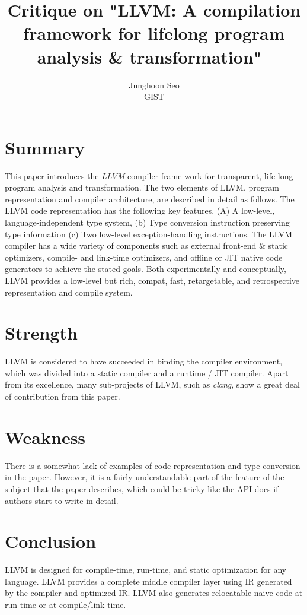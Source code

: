 \documentclass[11pt,a4paper]{article}
\begin{document}
\title{Critique on "LLVM: A compilation framework for lifelong program analysis \& transformation"~\cite{lattner2004llvm}}
\author{Junghoon Seo\\GIST}

\maketitle

\section{Summary}

This paper introduces the \textit{LLVM} compiler frame work for transparent, life-long program analysis and transformation. The two elements of LLVM, program representation and compiler architecture, are described in detail as follows. The LLVM code representation has the following key features. (A) A low-level, language-independent type system, (b) Type conversion instruction preserving type information (c) Two low-level exception-handling instructions. The LLVM compiler has a wide variety of components such as external front-end \& static optimizers, compile- and link-time optimizers, and offline or JIT native code generators to achieve the stated goals. Both experimentally and conceptually, LLVM provides a low-level but rich, compat, fast, retargetable, and retrospective representation and compile system.

\section{Strength}

LLVM is considered to have succeeded in binding the compiler environment, which was divided into a static compiler and a runtime / JIT compiler. Apart from its excellence, many sub-projects of LLVM, such as \textit{clang}, show a great deal of contribution from this paper.

\section{Weakness}

There is a somewhat lack of examples of code representation and type conversion in the paper. However, it is a fairly understandable part of the feature of the subject that the paper describes, which could be tricky like the API docs if authors start to write in detail.

\section{Conclusion}

LLVM is designed for compile-time, run-time, and static optimization for any language. LLVM provides a complete middle compiler layer using IR generated by the compiler and optimized IR. LLVM also generates relocatable naive code at run-time or at compile/link-time.



\end{document}

